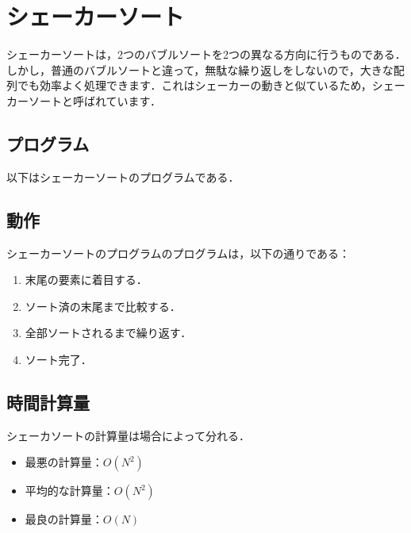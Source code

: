 \documentclass[a4j, titlepage]{jarticle}
\begin{document}
        
    \section{シェーカーソート}
        シェーカーソートは，2つのバブルソートを2つの異なる方向に行うものである．しかし，普通のバブルソートと違って，無駄な繰り返しをしないので，大きな配列でも効率よく処理できます\cite{cite:geek}．これはシェーカーの動きと似ているため，シェーカーソートと呼ばれています．

        \subsection{プログラム}
            以下はシェーカーソートのプログラムである．
            
        
        \subsection{動作}
        シェーカーソートのプログラムのプログラムは，以下の通りである：
            \begin{screen}
                \begin{enumerate}
                    \item 末尾の要素に着目する．
                    \item ソート済の末尾まで比較する．
                    \item 全部ソートされるまで繰り返す．
                    \item ソート完了．
                \end{enumerate}
            \end{screen}
        
        \subsection{時間計算量}
            シェーカソートの計算量は場合によって分れる．
            \begin{itemize}
                \item 最悪の計算量：$O(N^2)$
                \item 平均的な計算量：$O(N^2)$
                \item 最良の計算量：$O(N)$
            \end{itemize}
\end{document}
